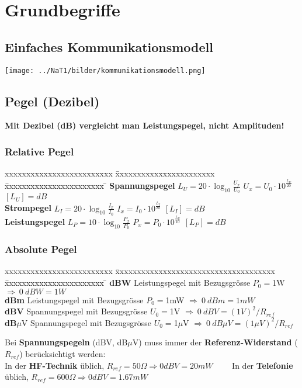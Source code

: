 \section{Grundbegriffe}
\subsection{Einfaches Kommunikationsmodell}
\begin{center}
	\texttt{[image: ../NaT1/bilder/kommunikationsmodell.png]}
\end{center}

\subsection{Pegel (Dezibel)}
\textbf{Mit Dezibel (dB) vergleicht man Leistungspegel, nicht Amplituden!}

\subsubsection{Relative Pegel}
	\begin{tabbing}
	xxxxxxxxxxxxxxxxxxxxxxxxx \= xxxxxxxxxxxxxxxxxxxxxxx  \= xxxxxxxxxxxxxxxxxxxxxxx \=\kill
	\textbf{Spannungspegel} \> $L_U = 20 \cdot \log_{10} \frac{U_x}{U_0}$ \> $U_x = U_0 \cdot
	10^{\frac{L_U}{20}} $ \> $[L_U] = dB$ \\ 
	\textbf{Strompegel} \> $L_I  = 20 \cdot \log_{10} \frac{I_x}{I_0}$ \> $I_x = I_0 \cdot
	10^{\frac{L_I}{20}} $ \> $[L_I] = dB$ \\ 
	\textbf{Leistungspegel} \> $L_P = 10 \cdot \log_{10} \frac{P_x}{P_0}$ \> $P_x = P_0 \cdot
	10^{\frac{L_U}{10}} $ \> $[L_P] = dB$
	\end{tabbing}

\subsubsection{Absolute Pegel}
	\begin{tabbing}
	xxxxxxxxxxxxxxxxxxxxxxxxx \= xxxxxxxxxxxxxxxxxxxxxxxxxxxxxxxxxxxxx  \= xxxxxxxxxxxxxxxxxxxxxxx \=\kill
	\textbf{dBW} \> Leistungspegel mit Bezugsgrösse $P_0 = $1W \> $\Longrightarrow \: 0 \: dBW = 1W$\\
	\textbf{dBm} \> Leistungspegel mit Bezugsgrösse $P_0 = $1mW \> $\Longrightarrow \: 0 \: dBm = 1mW$\\
	\textbf{dBV} \> Spannungspegel mit Bezugsgrösse $U_0 = $1V \> $\Longrightarrow \: 0 \: dBV = (1V)^2/R_{ref}$\\
	\textbf{dB}$\mu$V \> Spannungspegel mit Bezugsgrösse $U_0 = $1$\mu$V \> $\Longrightarrow \: 0 \: dB \mu V = (1 \mu V)^2/R_{ref}$
	\end{tabbing}
Bei \textbf{Spannungspegeln} (dBV, dB$\mu$V) muss immer der \textbf{Referenz-Widerstand} ($R_{ref}$) berücksichtigt werden: \\
In der \textbf{HF-Technik} üblich, $R_{ref} = 50 \Omega \Rightarrow 0 dBV = 20 mW \qquad $
In der \textbf{Telefonie} üblich, $R_{ref} = 600  \Omega \Rightarrow 0 dBV =
1.67 mW$ 

